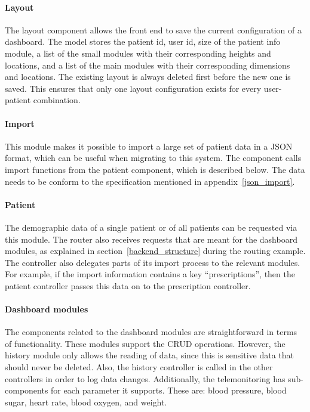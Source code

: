             \paragraph{Layout} The layout component allows the front end to save the current configuration of a dashboard. The model stores the patient id, user id, size of the patient info module, a list of the small modules with their corresponding heights and locations, and a list of the main modules with their corresponding dimensions and locations. The existing layout is always deleted first before the new one is saved. This ensures that only one layout configuration exists for every user-patient combination.

            \paragraph{Import} This module makes it possible to import a large set of patient data in a JSON format, which can be useful when migrating to this system. The component calls import functions from the patient component, which is described below. The data needs to be conform to the specification mentioned in appendix~\ref{json_import}.

            \paragraph{Patient} The demographic data of a single patient or of all patients can be requested via this module. The router also receives requests that are meant for the dashboard modules, as explained in section~\ref{backend_structure} during the routing example. The controller also delegates parts of its import process to the relevant modules. For example, if the import information contains a key ``prescriptions'', then the patient controller passes this data on to the prescription controller.

            \paragraph{Dashboard modules} The components related to the dashboard modules are straightforward in terms of functionality. These modules support the CRUD operations. However, the history module only allows the reading of data, since this is sensitive data that should never be deleted. Also, the history controller is called in the other controllers in order to log data changes. Additionally, the telemonitoring has sub-components for each parameter it supports. These are: blood pressure, blood sugar, heart rate, blood oxygen, and weight.

